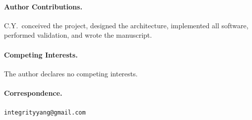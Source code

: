 \documentclass[11pt]{article}
\begin{document}
\paragraph{Author Contributions.}
C.Y.\ conceived the project, designed the architecture, implemented
all software, performed validation, and wrote the manuscript.

\paragraph{Competing Interests.}
The author declares no competing interests.

\paragraph{Correspondence.}
\texttt{integrityyang@gmail.com}



\end{document}

